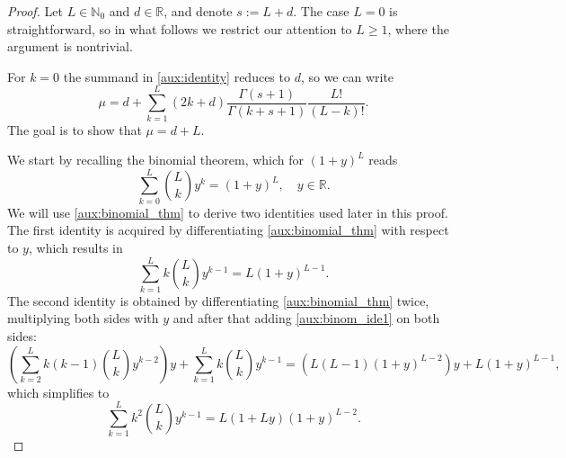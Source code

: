 \documentclass[10pt,a4paper]{amsart}
\newcommand{\N}{\mathbb{N}}
\newcommand{\R}{\mathbb{R}}
\begin{document}
\begin{proof}
    Let \( L \in \N_0 \) and \( d \in \R \), and denote \( s := L + d \).
    The case \( L = 0 \) is straightforward, so in what follows we restrict our attention to \( L \geq 1 \), where the argument is nontrivial.

    
    For \( k=0 \) the summand in \eqref{aux:identity} reduces to \( d \), so we can write
    \begin{equation}
        \mu = d + \sum^L_{k=1} (2k+d) \frac{\Gamma(s+1)}{\Gamma(k+s+1)} \frac{L!}{(L-k)!}.
    \end{equation}
    The goal is to show that \( \mu = d + L \).


    We start by recalling the binomial theorem, which for \( (1+y)^L \) reads
    \begin{equation} \label{aux:binomial_thm}
        \sum^L_{k=0} \binom{L}{k} y^k = (1+y)^L, \quad y \in \R.
    \end{equation}
    We will use \eqref{aux:binomial_thm} to derive two identities used later in this proof.
    The first identity is acquired by differentiating \eqref{aux:binomial_thm} with respect to \( y \), which results in
    \begin{equation} \label{aux:binom_ide1}
        \sum^L_{k=1} k \binom{L}{k} y^{k-1} = L (1+y)^{L-1}.
    \end{equation}
    The second identity is obtained by differentiating \eqref{aux:binomial_thm} twice, multiplying both sides with \( y \) and after that adding \eqref{aux:binom_ide1} on both sides:
    \begin{equation*}
        \left( \sum^L_{k=2} k(k-1) \binom{L}{k} y^{k-2} \right) y + \sum^L_{k=1} k \binom{L}{k} y^{k-1} = \left( L (L-1)(1+y)^{L-2} \right) y + L(1+y)^{L-1},
    \end{equation*}
    which simplifies to
    \begin{equation} \label{aux:binom_ide2}
        \sum^L_{k=1} k^2 \binom{L}{k} y^{k-1} = L (1 + Ly) (1 + y)^{L-2}.
    \end{equation}



\end{proof}
\end{document}

